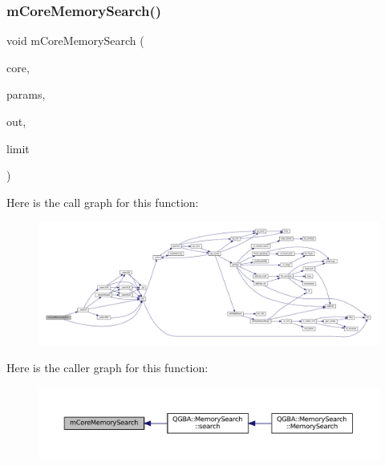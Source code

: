 \subsubsection{\texorpdfstring{m\+Core\+Memory\+Search()}{mCoreMemorySearch()}}
{\footnotesize\ttfamily void m\+Core\+Memory\+Search (\begin{DoxyParamCaption}\item[{struct m\+Core $\ast$}]{core,  }\item[{const struct m\+Core\+Memory\+Search\+Params $\ast$}]{params,  }\item[{struct m\+Core\+Memory\+Search\+Results $\ast$}]{out,  }\item[{size\+\_\+t}]{limit }\end{DoxyParamCaption})}

Here is the call graph for this function\+:
\nopagebreak
\begin{figure}[H]
\begin{center}
\leavevmode
\includegraphics[width=350pt]{mem-search_8c_ada9f367c156717a3e0f6475e27a9c970_cgraph}
\end{center}
\end{figure}
Here is the caller graph for this function\+:
\nopagebreak
\begin{figure}[H]
\begin{center}
\leavevmode
\includegraphics[width=350pt]{mem-search_8c_ada9f367c156717a3e0f6475e27a9c970_icgraph}
\end{center}
\end{figure}
\mbox{\label{mem-search_8c_a6b178f5e5e77aaa20eb7a023ef35f2fe}} 
